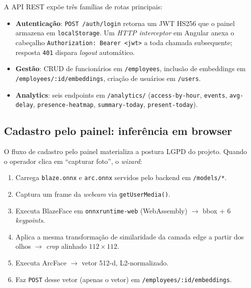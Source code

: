 \documentclass[12pt,a4paper]{report}
\begin{document}
A API REST expõe três famílias de rotas principais:

\begin{itemize}
    \item \textbf{Autenticação}: \texttt{POST /auth/login} retorna
        um JWT HS256 que o painel armazena em \texttt{localStorage}.
        Um \textit{HTTP interceptor} em Angular anexa o cabeçalho
        \texttt{Authorization: Bearer <jwt>} a toda chamada
        subsequente; resposta \texttt{401} dispara \textit{logout}
        automático.
    \item \textbf{Gestão}: CRUD de funcionários em
        \texttt{/employees}, inclusão de embeddings em
        \texttt{/employees/:id/embeddings}, criação de usuários em
        \texttt{/users}.
    \item \textbf{Analytics}: seis endpoints em \texttt{/analytics/}
        (\texttt{access-by-hour}, \texttt{events}, \texttt{avg-delay},
        \texttt{presence-heatmap}, \texttt{summary-today},
        \texttt{present-today}).
\end{itemize}

\subsection{Cadastro pelo painel: inferência em browser}

O fluxo de cadastro pelo painel materializa a postura LGPD do projeto.
Quando o operador clica em ``capturar foto'', o \textit{wizard}:

\begin{enumerate}
    \item Carrega \texttt{blaze.onnx} e \texttt{arc.onnx} servidos pelo
        backend em \texttt{/models/*}.
    \item Captura um frame da \textit{webcam} via
        \texttt{getUserMedia()}.
    \item Executa BlazeFace em \texttt{onnxruntime-web} (WebAssembly)
        $\rightarrow$ bbox + 6 \textit{keypoints}.
    \item Aplica a mesma transformação de similaridade da camada edge
        a partir dos olhos $\rightarrow$ \textit{crop} alinhado
        $112\times112$.
    \item Executa ArcFace $\rightarrow$ vetor 512-d, L2-normalizado.
    \item Faz \texttt{POST} desse vetor (apenas o vetor) em
        \texttt{/employees/:id/embeddings}.
\end{enumerate}
\end{document}
